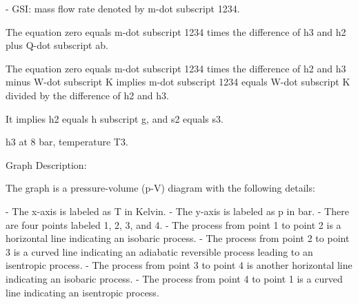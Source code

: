 - GSI: mass flow rate denoted by m-dot subscript 1234.

The equation zero equals m-dot subscript 1234 times the difference of h3 and h2 plus Q-dot subscript ab.

The equation zero equals m-dot subscript 1234 times the difference of h2 and h3 minus W-dot subscript K implies m-dot subscript 1234 equals W-dot subscript K divided by the difference of h2 and h3.

It implies h2 equals h subscript g, and s2 equals s3.

h3 at 8 bar, temperature T3.

Graph Description:

The graph is a pressure-volume (p-V) diagram with the following details:

- The x-axis is labeled as T in Kelvin.
- The y-axis is labeled as p in bar.
- There are four points labeled 1, 2, 3, and 4.
- The process from point 1 to point 2 is a horizontal line indicating an isobaric process.
- The process from point 2 to point 3 is a curved line indicating an adiabatic reversible process leading to an isentropic process.
- The process from point 3 to point 4 is another horizontal line indicating an isobaric process.
- The process from point 4 to point 1 is a curved line indicating an isentropic process.